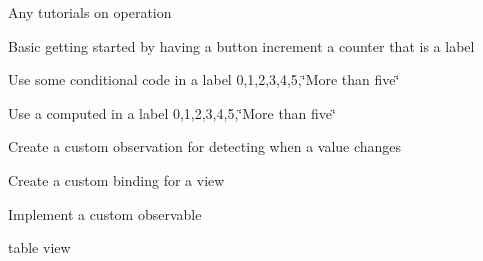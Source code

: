 Any tutorials on operation


\begin{DoxyItemize}
\item Basic getting started by having a button increment a counter that is a label
\item Use some conditional code in a label 0,1,2,3,4,5,\char`\"{}\+More than five\char`\"{}
\item Use a computed in a label 0,1,2,3,4,5,\char`\"{}\+More than five\char`\"{}
\item Create a custom observation for detecting when a value changes
\item Create a custom binding for a view
\item Implement a custom observable
\item table view 
\end{DoxyItemize}